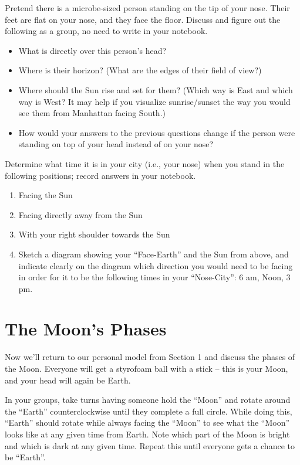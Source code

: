 \documentclass[11pt]{article}%
\begin{document}
Pretend there is a microbe-sized person standing on the tip of your nose.
Their feet are flat on your nose, and they face the floor.
Discuss and figure out the following as a group, no need to write in your
notebook.
\begin{itemize}
	\item What is directly over this person's head?
	\item Where is their horizon? (What are the edges of their field of view?)
	\item Where should the Sun rise and set for them? (Which way is East and which way is West?  It may help if you visualize sunrise/sunset the way you would see them from Manhattan facing South.)
	\item How would your answers to the previous questions change if the person were standing on top of your head instead of on your nose?
\end{itemize}

Determine what time it is in your city (i.e., your nose) when you stand in the following positions; record answers in your notebook.
\begin{enumerate}
	\item Facing the Sun
	\item Facing directly away from the Sun
	\item With your right shoulder towards the Sun
    \item Sketch a diagram showing your ``Face-Earth'' and the Sun from above, and indicate clearly on the diagram which direction you would need to be facing in order for it to be the following times in your ``Nose-City'': 6 am, Noon, 3 pm.
\end{enumerate}

\section{The Moon's Phases}
Now we'll return to our personal model from Section 1 and discuss the phases of the Moon. Everyone will get a styrofoam ball with a stick -- this is your Moon, and your head will again be Earth.

In your groups, take turns having someone hold the ``Moon'' and rotate around the ``Earth'' counterclockwise until they complete a full circle.  While doing this, ``Earth'' should rotate while always facing the ``Moon'' to see what the ``Moon'' looks like at any given time from Earth. Note which part of the Moon is bright and which is dark at any given time.  Repeat this until everyone gets a chance to be ``Earth''.
\end{document}
